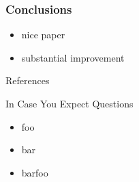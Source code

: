 \documentclass[presentation,professionalfonts]{beamer}
\begin{document}
\begin{frame}
  \frametitle{Conclusions}
  \begin{itemize}
  \item nice paper 
  \item substantial improvement
  \end{itemize}  
\end{frame}


\begin{frame}[fragile]{References}
\printbibliography
\end{frame}

\appendix

\begin{frame}{In Case You Expect Questions}
\centering
\begin{itemize}
\item foo
\item bar
\item barfoo
\end{itemize}
\end{frame}
\end{document}
